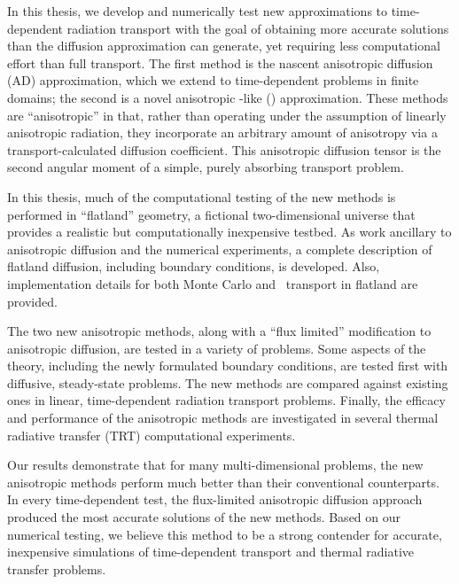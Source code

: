 
In this thesis, we develop and numerically test new approximations to
time-dependent radiation transport with the goal of obtaining more accurate
solutions than the diffusion approximation can generate, yet requiring less
computational effort than full transport.
The first method is the nascent anisotropic diffusion (AD)
approximation, which we extend to time-dependent problems in finite domains; the
second is a novel anisotropic \Pone-like (\APone) approximation. These methods
are ``anisotropic'' in that, rather than operating under the assumption of
linearly anisotropic radiation, they incorporate an arbitrary amount of
anisotropy via a transport-calculated diffusion coefficient. This anisotropic
diffusion tensor is the second angular moment of a simple, purely
absorbing transport problem.

In this thesis, much of the computational testing of the new methods is performed in
``flatland'' geometry, a fictional two-dimensional universe that provides a
realistic but computationally inexpensive testbed. As work ancillary to
anisotropic
diffusion and the numerical experiments, a complete description
of flatland diffusion, including boundary conditions, is developed. Also,
implementation details for both Monte Carlo and \SN\ transport in
flatland are provided.

The two new anisotropic methods, along with a ``flux limited'' modification to
anisotropic diffusion, are tested in a variety of problems. Some aspects of the
theory, including the newly formulated boundary conditions, are tested first with
diffusive, steady-state problems. The new methods are compared against
existing ones in linear, time-dependent radiation transport problems. Finally,
the efficacy and performance of the anisotropic methods are investigated in
several thermal radiative transfer (TRT) computational experiments.

Our results demonstrate that for many multi-dimensional problems, the new
anisotropic methods perform much better than their conventional counterparts.
In every time-dependent test, the flux-limited anisotropic diffusion
approach produced the most accurate solutions of the new methods.
Based on our numerical testing, we believe this method to be a strong contender
for accurate, inexpensive simulations of time-dependent transport and
thermal radiative transfer problems.

